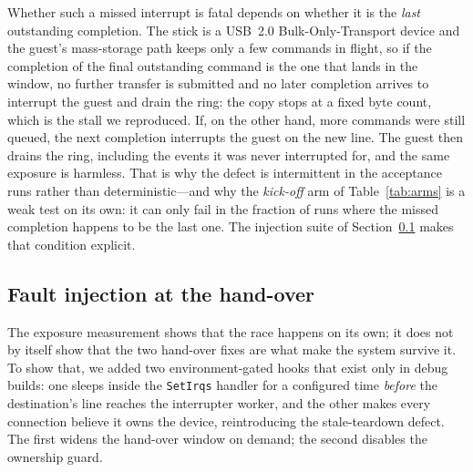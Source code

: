 \documentclass[10pt,conference]{IEEEtran}
\newcommand{\code}[1]{\texttt{#1}}
\begin{document}
Whether such a missed interrupt is fatal depends on whether it is the
\emph{last} outstanding completion. The stick is a USB~2.0 Bulk-Only-Transport
device and the guest's mass-storage path keeps only a few commands in flight, so
if the completion of the final outstanding command is the one that lands in the
window, no further transfer is submitted and no later completion arrives to
interrupt the guest and drain the ring: the copy stops at a fixed byte count,
which is the stall we reproduced. If, on the other hand, more commands were still
queued, the next completion interrupts the guest on the new line. The guest then
drains the ring, including the events it was never interrupted for, and the same
exposure is harmless. That is why the defect is intermittent in the acceptance
runs rather than deterministic---and why the \emph{kick-off} arm of
Table~\ref{tab:arms} is a weak test on its own: it can only fail in the fraction
of runs where the missed completion happens to be the last one. The injection
suite of Section~\ref{sec:injection} makes that condition explicit.

\subsection{Fault injection at the hand-over}
\label{sec:injection}
The exposure measurement shows that the race happens on its own; it does not by
itself show that the two hand-over fixes are what make the system survive it. To
show that, we added two environment-gated hooks that exist only in debug builds:
one sleeps inside the \code{SetIrqs} handler for a configured time
\emph{before} the destination's line reaches the interrupter worker, and the
other makes every connection believe it owns the device, reintroducing the
stale-teardown defect. The first widens the hand-over window on demand; the
second disables the ownership guard.
\end{document}
